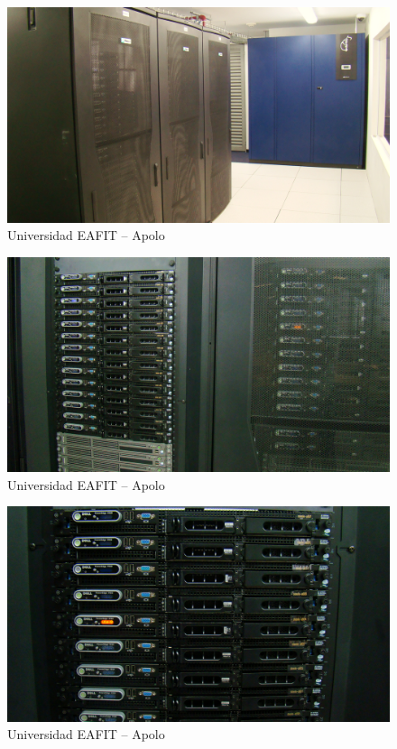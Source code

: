 \begin{frame}
 \begin{figure}[ht]
        \centering
        \includegraphics[scale=0.15]{imgs/apolo2}
        \caption{Universidad EAFIT -- Apolo}
 \end{figure}
\end{frame}


\begin{frame}
 \begin{figure}[ht]
        \centering
        \includegraphics[scale=0.15]{imgs/apolo3}
        \caption{Universidad EAFIT -- Apolo}
 \end{figure}
\end{frame}


\begin{frame}
 \begin{figure}[ht]
        \centering
        \includegraphics[scale=0.15]{imgs/apolo4}
        \caption{Universidad EAFIT -- Apolo}
 \end{figure}
\end{frame}


